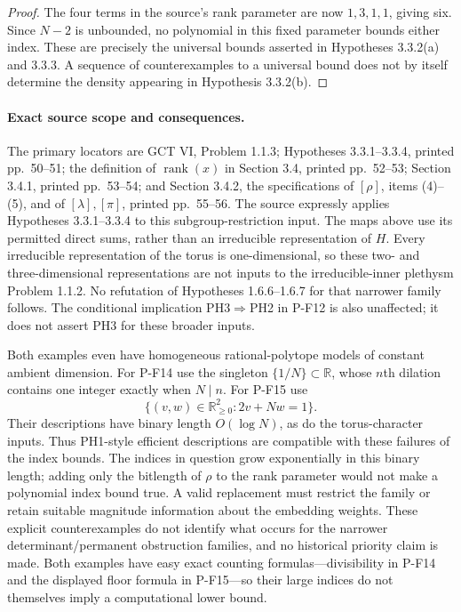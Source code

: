 \documentclass[11pt,a4paper]{article}
\begin{document}
\begin{proof}
The four terms in the source's rank parameter are now $1,3,1,1$,
giving six. Since $N-2$ is unbounded, no polynomial in this fixed
parameter bounds either index. These are precisely the universal
bounds asserted in Hypotheses 3.3.2(a) and 3.3.3. A sequence of
counterexamples to a universal bound does not by itself determine
the density appearing in Hypothesis 3.3.2(b).
\end{proof}

\paragraph{Exact source scope and consequences.}
The primary locators are GCT VI, Problem 1.1.3; Hypotheses 3.3.1--3.3.4,
printed pp.~50--51; the definition of $\operatorname{rank}(x)$ in
Section 3.4, printed pp.~52--53; Section 3.4.1, printed pp.~53--54;
and Section 3.4.2, the specifications of $[\rho]$, items (4)--(5),
and of $[\lambda],[\pi]$, printed pp.~55--56.
The source expressly applies Hypotheses 3.3.1--3.3.4 to this
subgroup-restriction input. The maps above use its permitted
direct sums, rather than an irreducible representation of $H$.
Every irreducible representation of the torus is one-dimensional,
so these two- and three-dimensional representations are not inputs
to the irreducible-inner plethysm Problem 1.1.2. No refutation of
Hypotheses 1.6.6--1.6.7 for that narrower family follows.
The conditional implication PH3$\Rightarrow$PH2 in P-F12 is also
unaffected; it does not assert PH3 for these broader inputs.

Both examples even have homogeneous rational-polytope models of
constant ambient dimension. For P-F14 use the singleton
$\{1/N\}\subset\mathbb R$, whose $n$th dilation contains one
integer exactly when $N\mid n$. For P-F15 use
\[
 \{(v,w)\in\mathbb R_{\ge0}^2:2v+Nw=1\}.
\]
Their descriptions have binary length $O(\log N)$, as do the
torus-character inputs. Thus PH1-style efficient descriptions are
compatible with these failures of the index bounds. The indices
in question grow exponentially in this binary length; adding only
the bitlength of $\rho$ to the rank parameter would not make a
polynomial index bound true. A valid replacement must restrict
the family or retain suitable magnitude information about the
embedding weights. These explicit counterexamples do not identify
what occurs for the narrower determinant/permanent obstruction
families, and no historical priority claim is made.
Both examples have easy exact counting formulas---divisibility in
P-F14 and the displayed floor formula in P-F15---so their large
indices do not themselves imply a computational lower bound.
\end{document}
